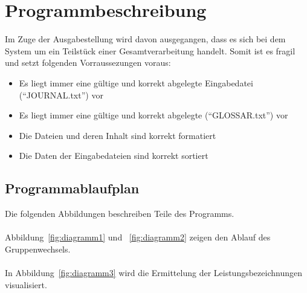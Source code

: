 \chapter{Programmbeschreibung}\label{ch:programmbeschreibung}
Im Zuge der Ausgabestellung wird davon ausgegangen, dass es sich bei dem System um ein Teilstück einer Gesamtverarbeitung handelt. Somit ist es fragil und setzt folgenden Vorraussezungen voraus: \\

\begin{itemize}[noitemsep]
    \item Es liegt immer eine gültige und korrekt abgelegte Eingabedatei (\enquote{JOURNAL.txt}) vor
    \item Es liegt immer eine gültige und korrekt abgelegte (\enquote{GLOSSAR.txt}) vor
    \item Die Dateien und deren Inhalt sind korrekt formatiert
    \item Die Daten der Eingabedateien sind korrekt sortiert

\end{itemize}

\section{Programmablaufplan}\label{sec:pap}
Die folgenden Abbildungen beschreiben Teile des Programms.\\
\\
Abbildung~\ref{fig:diagramm1} und ~\ref{fig:diagramm2} zeigen den Ablauf des Gruppenwechsels.\\
\\
In Abbildung~\ref{fig:diagramm3} wird die Ermittelung der Leistungsbezeichnungen visualisiert.


